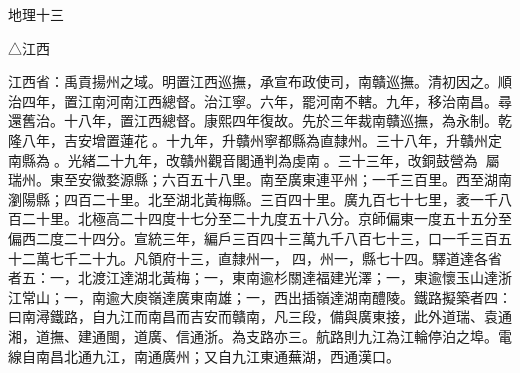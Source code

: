 
\begin{pinyinscope}
地理十三

△江西

江西省：禹貢揚州之域。明置江西巡撫，承宣布政使司，南贛巡撫。清初因之。順治四年，置江南河南江西總督。治江寧。六年，罷河南不轄。九年，移治南昌。尋還舊治。十八年，置江西總督。康熙四年復故。先於三年裁南贛巡撫，為永制。乾隆八年，吉安增置蓮花。十九年，升贛州寧都縣為直隸州。三十八年，升贛州定南縣為。光緒二十九年，改贛州觀音閣通判為虔南。三十三年，改銅鼓營為，屬瑞州。東至安徽婺源縣；六百五十八里。南至廣東連平州；一千三百里。西至湖南瀏陽縣；四百二十里。北至湖北黃梅縣。三百四十里。廣九百七十七里，袤一千八百二十里。北極高二十四度十七分至二十九度五十八分。京師偏東一度五十五分至偏西二度二十四分。宣統三年，編戶三百四十三萬九千八百七十三，口一千三百五十二萬七千二十九。凡領府十三，直隸州一，四，州一，縣七十四。驛道達各省者五：一，北渡江達湖北黃梅；一，東南逾杉關達福建光澤；一，東逾懷玉山達浙江常山；一，南逾大庾嶺達廣東南雄；一，西出插嶺達湖南醴陵。鐵路擬築者四：曰南潯鐵路，自九江而南昌而吉安而贛南，凡三段，備與廣東接，此外道瑞、袁通湘，道撫、建通閩，道廣、信通浙。為支路亦三。航路則九江為江輪停泊之埠。電線自南昌北通九江，南通廣州；又自九江東通蕪湖，西通漢口。


\end{pinyinscope}
